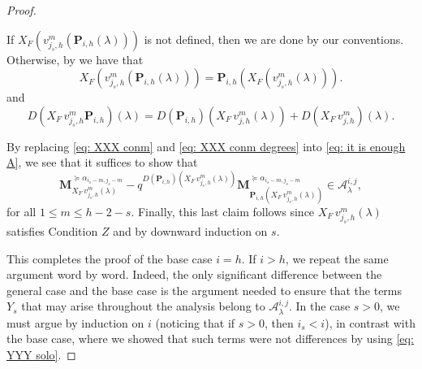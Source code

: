\begin{proof}
\begin{itemize}
If $X_F(v_{j_s,h}^m(\mathbf{P}_{i,h}(\lambda)))$ is not defined, then we are done by our conventions. 
Otherwise, by  we have that
\begin{equation}\label{eq: XXX conm}
    X_F(v_{j_s,h}^m(\mathbf{P}_{i,h}(\lambda))) = \mathbf{P}_{i,h}(X_F(v_{j_s,h}^m(\lambda))).
\end{equation}
and 
\begin{equation} \label{eq: XXX  conm degrees}
    D(  X_F \, v_{j_s,h}^m \mathbf{P}_{i,h}  )(\lambda) = D(\mathbf{P}_{i,h})(X_F \, v_{j,h}^m (\lambda)) + D(X_F \, v_{j,h}^m )(\lambda).
\end{equation}

By replacing \eqref{eq: XXX conm} and \eqref{eq: XXX  conm degrees} into \eqref{eq: it is enough A}, we see that it suffices to show that 
\begin{equation}
   \mathbf{M}_{X_F\, v_{j_s,h}^m(\lambda)}^{\succeq \alpha_{i_s-m,j_s-m}}  - q^{ D(\mathbf{P}_{i,h})( X_F \, v_{j_s,h}^m  (  \lambda))} \mathbf{M}_{  \mathbf{P}_{i,h} (X_F \, v_{j_s,h}^m (\lambda))}^{\succeq \alpha_{i_s-m,j_s-m}}\in \mathcal{A}_{\lambda}^{i,j}, 
\end{equation}
for all $1\leq m \leq h-2-s$. 
Finally, this last claim follows since $X_F \, v_{j_s,h}^m (\lambda)$ satisfies Condition $Z$ and by downward induction on $s$.
\end{itemize}
This completes the proof of the base case $i=h$. 
If $i>h$, we repeat the same argument word by word. 
Indeed, the only significant difference between the general case and the base case is the argument needed to ensure that the terms $Y_s$ that may arise throughout the analysis belong to $\mathcal{A}_{\lambda}^{i,j}$. In the case $s>0$, we must argue by induction on $i$ (noticing that if $s>0$, then $i_s<i$), in contrast with the base case, where we showed that such terms were not differences by using \eqref{eq: YYY solo}. 
\end{proof}










